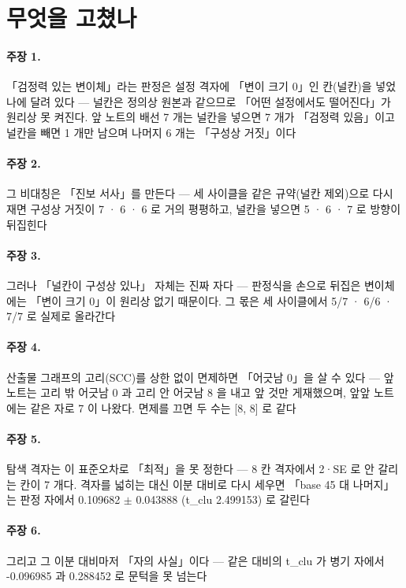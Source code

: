 \section{무엇을 고쳤나}

\paragraph{주장 1.} 「검정력 있는 변이체」라는 판정은 설정 격자에 「변이 크기 0」인 칸(널칸)을 넣었나에 달려 있다 --- 널칸은 정의상 원본과 같으므로 「어떤 설정에서도 떨어진다」가 원리상 못 켜진다. 앞 노트의 배선 7 개는 널칸을 넣으면 7 개가 「검정력 있음」이고 널칸을 빼면 1 개만 남으며 나머지 6 개는 「구성상 거짓」이다

\paragraph{주장 2.} 그 비대칭은 「진보 서사」를 만든다 --- 세 사이클을 같은 규약(널칸 제외)으로 다시 재면 구성상 거짓이 7 · 6 · 6 로 거의 평평하고, 널칸을 넣으면 5 · 6 · 7 로 방향이 뒤집힌다

\paragraph{주장 3.} 그러나 「널칸이 구성상 있나」 자체는 진짜 자다 --- 판정식을 손으로 뒤집은 변이체에는 「변이 크기 0」이 원리상 없기 때문이다. 그 몫은 세 사이클에서 5/7 · 6/6 · 7/7 로 실제로 올라간다

\paragraph{주장 4.} 산출물 그래프의 고리(SCC)를 상한 없이 면제하면 「어긋남 0」을 살 수 있다 --- 앞 노트는 고리 밖 어긋남 0 과 고리 안 어긋남 8 을 내고 앞 것만 게재했으며, 앞앞 노트에는 같은 자로 7 이 나왔다. 면제를 끄면 두 수는 [8, 8] 로 같다

\paragraph{주장 5.} 탐색 격자는 이 표준오차로 「최적」을 못 정한다 --- 8 칸 격자에서 2·SE 로 안 갈리는 칸이 7 개다. 격자를 넓히는 대신 이분 대비로 다시 세우면 「base 45 대 나머지」는 판정 자에서 0.109682 $\pm$ 0.043888 (t\_clu 2.499153) 로 갈린다

\paragraph{주장 6.} 그리고 그 이분 대비마저 「자의 사실」이다 --- 같은 대비의 t\_clu 가 병기 자에서 -0.096985 과 0.288452 로 문턱을 못 넘는다

